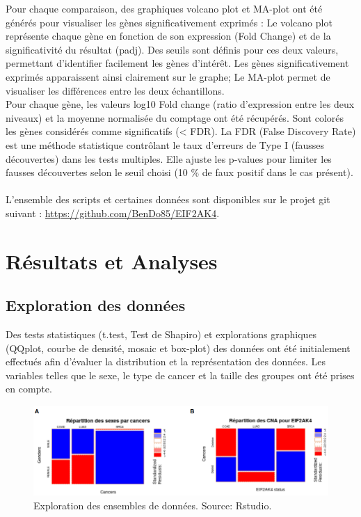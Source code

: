 \documentclass{style}
\begin{document}
Pour chaque comparaison, des graphiques volcano plot et MA-plot ont été générés pour visualiser les gènes significativement exprimés : Le volcano plot représente chaque gène en fonction de son expression (Fold Change) et de la significativité du résultat (padj). Des seuils sont définis pour ces deux valeurs, permettant d'identifier facilement les gènes d'intérêt. Les gènes significativement exprimés apparaissent ainsi clairement sur le graphe; Le MA-plot permet de visualiser les différences entre les deux échantillons. \\
Pour chaque gène, les valeurs log10 Fold change (ratio d’expression entre les deux niveaux) et la moyenne normalisée du comptage ont été récupérés. Sont colorés les gènes considérés comme significatifs (< FDR).
La FDR (False Discovery Rate) est une méthode statistique contrôlant le taux d'erreurs de Type I (fausses découvertes) dans les tests multiples. Elle ajuste les p-values pour limiter les fausses découvertes selon le seuil choisi (10 \% de faux positif dans le cas présent). \\ \\
L’ensemble des scripts et certaines données sont disponibles sur le projet git suivant : \hyperlink{https://github.com/BenDo85/EIF2AK4}{https://github.com/BenDo85/EIF2AK4}.

\newpage
\section{Résultats et Analyses}
\subsection{Exploration des données}
Des tests statistiques (t.test, Test de Shapiro) et explorations graphiques (QQplot, courbe de densité, mosaic et box-plot) des données ont été initialement effectués afin d’évaluer la distribution et la représentation des données. Les variables telles que le sexe, le type de cancer et la taille des groupes ont été prises en compte. \\

\begin{figure}[H]
  \centering
  \includegraphics[width=16cm]{images/figures/mosaic.png}
  \caption[Exploration des ensembles de données.]{Exploration des ensembles de données. Source: Rstudio.}
  \label{fig:mosaic}
\end{figure}
\end{document}

